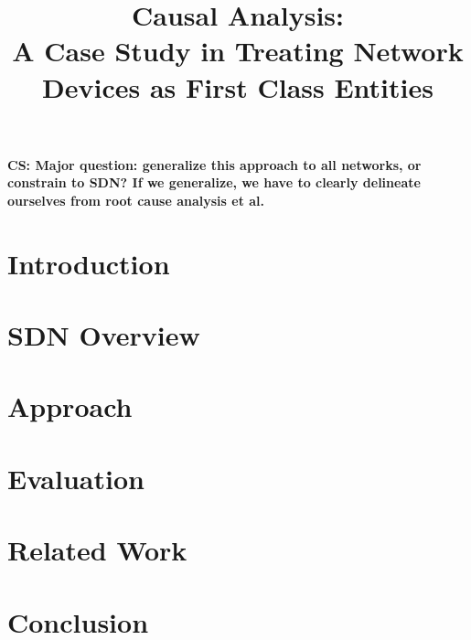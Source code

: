\documentclass{sig-alternate-10pt}
\title{Causal Analysis: \\ A Case Study in Treating Network Devices as First Class Entities}
\newcommand{\colin}[1]{{\color{red}\bf CS: {#1}}}
\begin{document}
    \date{}
    \maketitle

    \thispagestyle{empty}

\abstract{{\it }}

\colin{Major question: generalize this approach to all networks, or constrain
       to SDN? If we generalize, we have to clearly delineate ourselves from
       root cause analysis et al.}

\section{Introduction}
\label{sec:intro}


\section{SDN Overview}
\label{sec:overview}


\section{Approach}
\label{sec:approach}


\section{Evaluation}
\label{sec:evaluation}


\section{Related Work}
\label{sec:related_work}


\section{Conclusion}
\label{sec:conclusion}


 \small 

%
\end{document}
